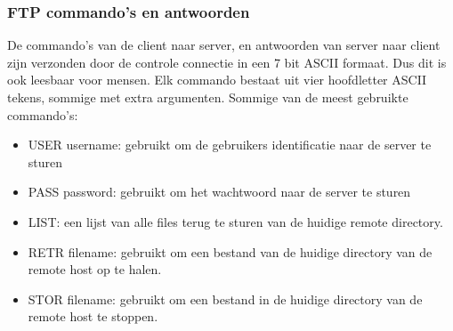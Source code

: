\newpage

\subsubsection{FTP commando’s en antwoorden}

\noindent De commando’s van de client naar server, en antwoorden van server naar client zijn verzonden door de controle connectie in een 7 bit ASCII formaat. Dus dit is ook leesbaar voor mensen. Elk commando bestaat uit vier hoofdletter ASCII tekens, sommige met extra argumenten. Sommige van de meest gebruikte commando’s:
\begin{itemize}
   \item USER username: gebruikt om de gebruikers identificatie naar de server te sturen
\item PASS password: gebruikt om het wachtwoord naar de server te sturen
\item LIST: een lijst van alle files terug te sturen van de huidige remote directory.
\item RETR filename: gebruikt om een bestand van de huidige directory van de remote host op te halen.
\item STOR filename: gebruikt om een bestand in de huidige directory van de remote host te stoppen.
\end{itemize}

